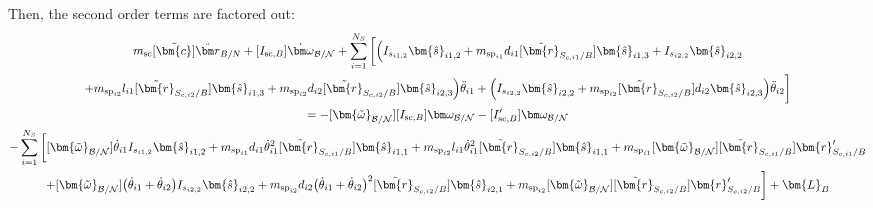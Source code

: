 \documentclass[paper]{aiaaNew}
\begin{document}
Then, the second order terms are factored out:
\begin{multline}
m_{\text{sc}} [\tilde{\bm{c}}] \ddot{\bm r}_{B/N} + [I_{\text{sc},B}] \dot{\bm\omega}_{\cal B/N} + \sum\limits_{i=1}^{N_S} \bigg[\Big(
I_{s_{i1,2}}\bm{\hat{s}}_{i1,2} 
+m_{\text{sp}_{i1}} d_{i1} [\tilde{\bm{r}}_{S_{c,i1}/B}] \bm{\hat{s}}_{i1,3} + I_{s_{i2,2}}\bm{\hat{s}}_{i2,2} \\
+m_{\text{sp}_{i2}} l_{i1} [\tilde{\bm{r}}_{S_{c,i2}/B}] \bm{\hat{s}}_{i1,3}
+m_{\text{sp}_{i2}} d_{i2} [\tilde{\bm{r}}_{S_{c,i2}/B}] \bm{\hat{s}}_{i2,3}\Big) \ddot{\theta}_{i1}
+\Big(I_{s_{i2,2}}\bm{\hat{s}}_{i2,2} 
+m_{\text{sp}_{i2}} [\tilde{\bm{r}}_{S_{c,i2}/B}] d_{i2}\bm{\hat{s}}_{i2,3}\Big) \ddot{\theta}_{i2} \bigg]\\
 = -[\bm{\tilde{\omega}}_{\cal B/N}] [I_{\text{sc},B}] \bm\omega_{\cal B/N} - [I'_{\text{sc},B}] \bm\omega_{\cal B/N} \\
-  \sum\limits_{i=1}^{N_S} \bigg[
[\bm{\tilde{\omega}}_{\cal B/N}] \dot{\theta}_{i1} I_{s_{i1,2}}\bm{\hat{s}}_{i1,2} 
+m_{\text{sp}_{i1}} d_{i1} \dot{\theta}_{i1}^2 [\tilde{\bm{r}}_{S_{c,i1}/B}] \bm{\hat{s}}_{i1,1}
+m_{\text{sp}_{i2}} l_{i1} \dot{\theta}_{i1}^2 [\tilde{\bm{r}}_{S_{c,i2}/B}] \bm{\hat{s}}_{i1,1}
+m_{\text{sp}_{i1}} [\bm{\tilde{\omega}}_{\cal B/N}] [\tilde{\bm{r}}_{S_{c,i1}/B}] \bm{r}'_{S_{c,i1}/B}\\
+ [\bm{\tilde{\omega}}_{\cal B/N}] \big(\dot{\theta}_{i1}+\dot{\theta}_{i2}\big) I_{s_{i2,2}}\bm{\hat{s}}_{i2,2}
+m_{\text{sp}_{i2}} d_{i2}\big(\dot{\theta}_{i1} + \dot{\theta}_{i2}\big)^2 [\tilde{\bm{r}}_{S_{c,i2}/B}] \bm{\hat{s}}_{i2,1}
+m_{\text{sp}_{i2}} [\bm{\tilde{\omega}}_{\cal B/N}] [\tilde{\bm{r}}_{S_{c,i2}/B}] \bm{r}'_{S_{c,i2}/B}\bigg]
+ \bm{L}_B
\label{eq:Finalint}
\end{multline}
\end{document}
